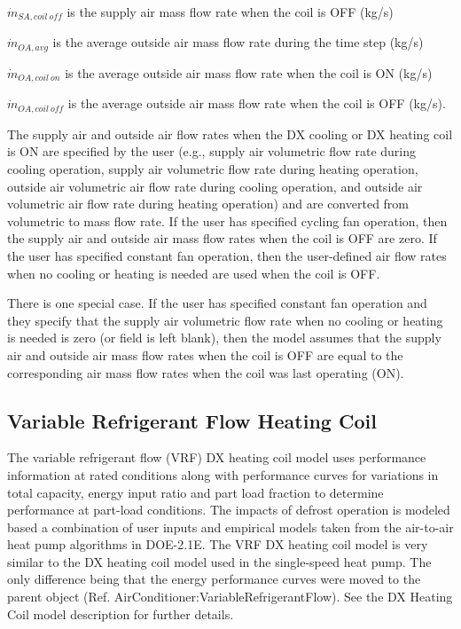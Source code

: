 \(\dot{m}_{SA,coil~off}\) is the supply air mass flow rate when the coil is OFF (kg/s)

\(\dot{m}_{OA,avg}\) is the average outside air mass flow rate during the time step (kg/s)

\(\dot{m}_{OA,coil~on}\) is the average outside air mass flow rate when the coil is ON (kg/s)

\(\dot{m}_{OA,coil~off}\) is the average outside air mass flow rate when the coil is OFF (kg/s).

The supply air and outside air flow rates when the DX cooling or DX heating coil is ON are specified by the user (e.g., supply air volumetric flow rate during cooling operation, supply air volumetric flow rate during heating operation, outside air volumetric air flow rate during cooling operation, and outside air volumetric air flow rate during heating operation) and are converted from volumetric to mass flow rate. If the user has specified cycling fan operation, then the supply air and outside air mass flow rates when the coil is OFF are zero. If the user has specified constant fan operation, then the user-defined air flow rates when no cooling or heating is needed are used when the coil is OFF.

There is one special case. If the user has specified constant fan operation and they specify that the supply air volumetric flow rate when no cooling or heating is needed is zero (or field is left blank), then the model assumes that the supply air and outside air mass flow rates when the coil is OFF are equal to the corresponding air mass flow rates when the coil was last operating (ON).

\subsection{Variable Refrigerant Flow Heating Coil}\label{variable-refrigerant-flow-heating-coil}

The variable refrigerant flow (VRF) DX heating coil model uses performance information at rated conditions along with performance curves for variations in total capacity, energy input ratio and part load fraction to determine performance at part-load conditions. The impacts of defrost operation is modeled based a combination of user inputs and empirical models taken from the air-to-air heat pump algorithms in DOE-2.1E. The VRF DX heating coil model is very similar to the DX heating coil model used in the single-speed heat pump. The only difference being that the energy performance curves were moved to the parent object (Ref. AirConditioner:VariableRefrigerantFlow). See the DX Heating Coil model description for further details.

